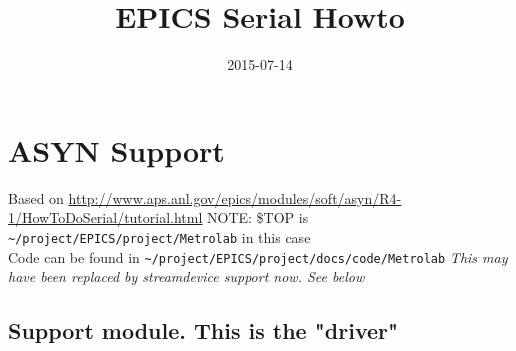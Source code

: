 \documentclass[11pt]{article}
\date{2015-07-14}
\title{EPICS Serial Howto}
\begin{document}
\maketitle

\section{ASYN Support}
\label{sec-1}
Based on \url{http://www.aps.anl.gov/epics/modules/soft/asyn/R4-1/HowToDoSerial/tutorial.html}
NOTE: \$TOP is \verb,~/project/EPICS/project/Metrolab, in this case\\
  Code can be found in \verb,~/project/EPICS/project/docs/code/Metrolab,
\emph{This may have been replaced by streamdevice support now. See below}

\subsection{Support module. This is the "driver"}
\label{sec-1-1}
\end{document}
